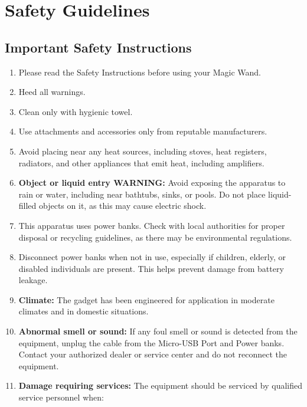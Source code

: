 %
%

\chapter{Safety Guidelines}

\section*{Important Safety Instructions}

\begin{enumerate}[label=\textbf{\arabic*.}]
	\item Please read the Safety Instructions before using your Magic Wand.
	\item Heed all warnings.
	\item Clean only with hygienic towel.
	\item Use attachments and accessories only from reputable manufacturers.
	\item Avoid placing near any heat sources, including stoves, heat registers, radiators, and other appliances that emit heat, including amplifiers.
	\item \textbf{Object or liquid entry WARNING:} Avoid exposing the apparatus to rain or water, including near bathtubs, sinks, or pools. Do not place liquid-filled objects on it, as this may cause electric shock.
	\item This apparatus uses power banks. Check with local authorities for proper disposal or recycling guidelines, as there may be environmental regulations.
	\item Disconnect power banks when not in use, especially if children, elderly, or disabled individuals are present. This helps prevent damage from battery leakage.
	\item \textbf{Climate:} The gadget has been engineered for application in moderate climates and in domestic situations.
	\item \textbf{Abnormal smell or sound:} If any foul smell or sound is detected from the equipment, unplug the cable from the Micro-USB Port and Power banks. Contact your authorized dealer or service center and do not reconnect the equipment.
	\item \textbf{Damage requiring services:} The equipment should be serviced by qualified service personnel when:

\end{enumerate}
